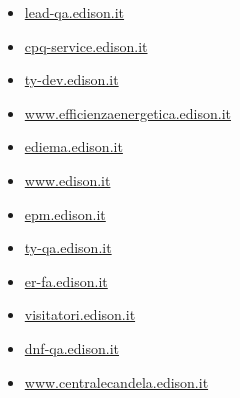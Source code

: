 \documentclass{article}
\begin{document}
\begin{itemize}
        \item \href{ http://lead-qa.edison.it/ }{ lead-qa.edison.it }
    
        
        
        \item \href{ http://cpq-service.edison.it/ }{ cpq-service.edison.it }
    
        
        
        \item \href{ https://ty-dev.edison.it/ }{ ty-dev.edison.it }
    
        
        
        \item \href{ https://www.efficienzaenergetica.edison.it/ }{ www.efficienzaenergetica.edison.it }
    
        
        
        \item \href{ http://ediema.edison.it/ }{ ediema.edison.it }
    
        
        
        \item \href{ https://www.edison.it/en/edison-and-credit-agricole-assurances-accelerate-together-development-renewables-italy }{ www.edison.it }
    
        
        
        \item \href{ http://epm.edison.it/ }{ epm.edison.it }
    
        
        
        \item \href{ https://ty-qa.edison.it/ }{ ty-qa.edison.it }
    
        
        
        \item \href{ https://er-fa.edison.it/login/?next=/ }{ er-fa.edison.it }
    
        
        
        \item \href{ https://visitatori.edison.it/ }{ visitatori.edison.it }
    
        
        
        \item \href{ https://dnf-qa.edison.it/ }{ dnf-qa.edison.it }
    
        
        
        \item \href{ http://www.centralecandela.edison.it/ }{ www.centralecandela.edison.it }
    

\end{itemize}
\end{document}
